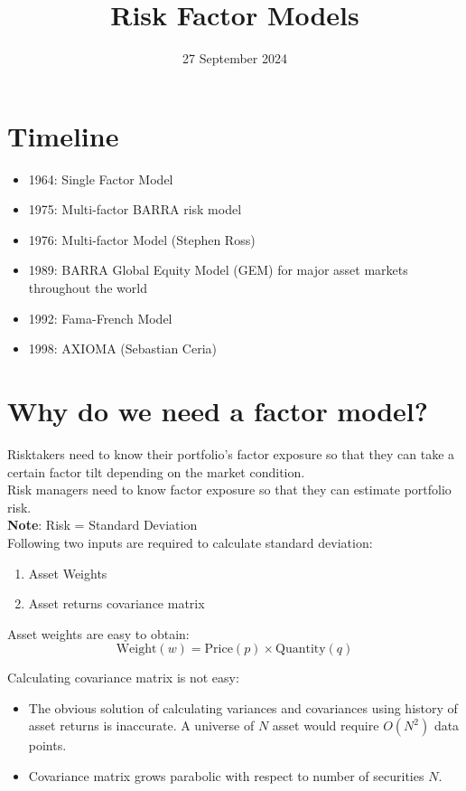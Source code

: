 \documentclass{article}
\begin{document}
\title{Risk Factor Models}
\author{}
\date{27 September 2024}
\maketitle

\section*{Timeline}
\begin{itemize}
    \item 1964: Single Factor Model
    \item 1975: Multi-factor BARRA risk model 
    \item 1976: Multi-factor Model (Stephen Ross)
    \item 1989: BARRA Global Equity Model (GEM) for major asset markets throughout the world
    \item 1992: Fama-French Model
    \item 1998: AXIOMA (Sebastian Ceria)
\end{itemize}


\section*{Why do we need a factor model?}
Risktakers need to know their portfolio's factor exposure so that they can take a certain factor tilt depending on the market condition.\\
Risk managers need to know factor exposure so that they can estimate portfolio risk.\\ 
\textbf{Note}: Risk = Standard Deviation \\

Following two inputs are required to calculate standard deviation:
\begin{enumerate}
    \item Asset Weights
    \item Asset returns covariance matrix
\end{enumerate}

Asset weights are easy to obtain:
\begin{equation}
    \text{Weight}(w) = \text{Price}(p) \times \text{Quantity}(q)
\end{equation}

Calculating covariance matrix is not easy:
\begin{itemize}
    \item The obvious solution of calculating variances and covariances using history of asset returns is inaccurate. A universe of \( N \) asset would require \( O(N^2) \) data points.
    \item Covariance matrix grows parabolic with respect to number of securities \( N \).
\end{itemize}
\end{document}
